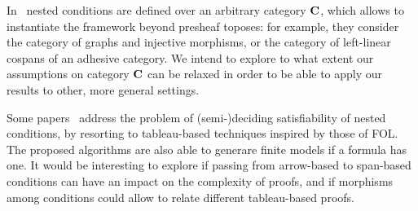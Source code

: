 In~\cite{bchk:conditional-reactive-systems,sksclo:coinductive-techniques-for-satisfiability} nested conditions are defined over an arbitrary category $\mathbf{C}$, which allows to instantiate the framework beyond presheaf toposes: for example, they consider the category of graphs and injective morphisms, or the category of left-linear cospans of an adhesive category. We intend to explore to what extent our assumptions on category $\mathbf{C}$ can be relaxed in order to be able to apply our results to other, more general settings.

Some papers~\cite{lo:tableau-graph-properties,slo:model-generation,sksclo:coinductive-techniques-for-satisfiability} address the problem of (semi-)deciding satisfiability of nested conditions, by resorting to tableau-based techniques inspired by those of FOL. The proposed algorithms are also able to generare finite models if a formula has one.
It would be interesting to explore if passing from arrow-based to span-based conditions can have an impact on the complexity of proofs, and if morphisms among conditions could allow to relate different tableau-based proofs.
